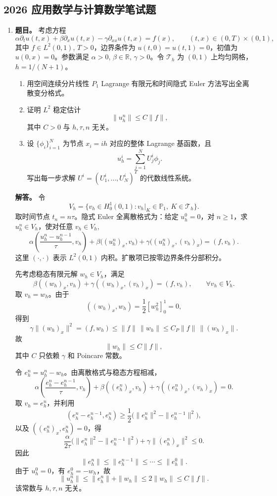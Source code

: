 ﻿\documentclass[UTF8,12pt]{ctexart}
\begin{document}
\subsection{2026 应用数学与计算数学笔试题}
\begin{enumerate}[label=\textbf{\arabic*.},leftmargin=2.2em]
\item \textbf{题目。} 考虑方程
\[
\alpha\partial_tu(t,x)+\beta\partial_xu(t,x)-\gamma\partial_{xx}u(t,x)=f(x),
\qquad (t,x)\in(0,T)\times(0,1),
\]
其中 \(f\in L^2(0,1)\), \(T>0\)，边界条件为 \(u(t,0)=u(t,1)=0\)，初值为 \(u(0,x)=0\)。参数满足 \(\alpha>0\), \(\beta\in\mathbb R\), \(\gamma>0\)。令 \(\mathcal T_h\) 为 \((0,1)\) 上均匀网格，\(h=1/(N+1)\)。
\begin{enumerate}[label=(\alph*),leftmargin=2.0em]
\item 用空间连续分片线性 \(P_1\) Lagrange 有限元和时间隐式 Euler 方法写出全离散变分格式。
\item 证明 \(L^2\) 稳定估计
\[
\|u_h^n\|\le C\|f\|,
\]
其中 \(C>0\) 与 \(h,\tau,n\) 无关。
\item 设 \(\{\phi_i\}_{i=1}^N\) 为节点 \(x_i=ih\) 对应的整体 Lagrange 基函数，且
\[
u_h^i=\sum_{j=1}^N U_j^i\phi_j.
\]
写出每一步求解 \(U^i=(U_1^i,\ldots,U_N^i)^T\) 的代数线性系统。
\end{enumerate}

\textbf{解答。} 令
\[
V_h=\{v_h\in H_0^1(0,1): v_h|_K\in\mathbb P_1,\ K\in\mathcal T_h\}.
\]
取时间节点 \(t_n=n\tau\)。隐式 Euler 全离散格式为：给定 \(u_h^0=0\)，对 \(n\ge1\)，求 \(u_h^n\in V_h\)，使对任意 \(v_h\in V_h\),
\[
\alpha\left(\frac{u_h^n-u_h^{n-1}}{\tau},v_h\right)
+\beta\bigl((u_h^n)_x,v_h\bigr)
+\gamma\bigl((u_h^n)_x,(v_h)_x\bigr)
=(f,v_h).
\]
这里 \((\cdot,\cdot)\) 表示 \(L^2(0,1)\) 内积。扩散项已按零边界条件分部积分。

先考虑稳态有限元解 \(w_h\in V_h\)，满足
\[
\beta((w_h)_x,v_h)+\gamma((w_h)_x,(v_h)_x)=(f,v_h),
\qquad \forall v_h\in V_h.
\]
取 \(v_h=w_h\)。由于
\[
((w_h)_x,w_h)=\frac12[w_h^2]_{0}^{1}=0,
\]
得到
\[
\gamma\|(w_h)_x\|^2=(f,w_h)
\le \|f\|\,\|w_h\|
\le C_P\|f\|\,\|(w_h)_x\|.
\]
故
\[
\|w_h\|\le C\|f\|,
\]
其中 \(C\) 只依赖 \(\gamma\) 和 Poincare 常数。

令 \(e_h^n=u_h^n-w_h\)。由离散格式与稳态方程相减，
\[
\alpha\left(\frac{e_h^n-e_h^{n-1}}{\tau},v_h\right)
+\beta((e_h^n)_x,v_h)
+\gamma((e_h^n)_x,(v_h)_x)=0.
\]
取 \(v_h=e_h^n\)，并利用
\[
(e_h^n-e_h^{n-1},e_h^n)
\ge \frac12\bigl(\|e_h^n\|^2-\|e_h^{n-1}\|^2\bigr),
\]
以及 \(((e_h^n)_x,e_h^n)=0\)，得
\[
\frac{\alpha}{2\tau}
\bigl(\|e_h^n\|^2-\|e_h^{n-1}\|^2\bigr)
+\gamma\|(e_h^n)_x\|^2\le0.
\]
因此
\[
\|e_h^n\|\le\|e_h^{n-1}\|\le\cdots\le\|e_h^0\|.
\]
由于 \(u_h^0=0\)，有 \(e_h^0=-w_h\)，故
\[
\|u_h^n\|\le \|e_h^n\|+\|w_h\|
\le 2\|w_h\|
\le C\|f\|.
\]
该常数与 \(h,\tau,n\) 无关。


\end{enumerate}
\end{document}
